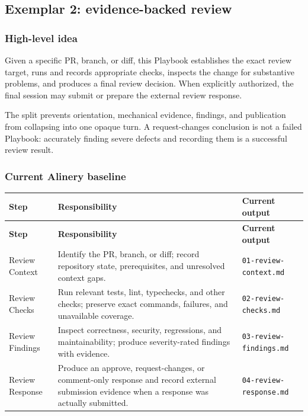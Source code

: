 \documentclass[11pt]{article}
\newcommand{\artifact}[1]{\texttt{#1}}
\begin{document}
\subsection{Exemplar 2: evidence-backed review}

\subsubsection{High-level idea}

Given a specific PR, branch, or diff, this Playbook establishes the exact review target, runs and records appropriate checks, inspects the change for substantive problems, and produces a final review decision. When explicitly authorized, the final session may submit or prepare the external review response.

The split prevents orientation, mechanical evidence, findings, and publication from collapsing into one opaque turn. A request-changes conclusion is not a failed Playbook: accurately finding severe defects and recording them is a successful review result.

\subsubsection{Current Alinery baseline}

\begin{longtable}{@{}L{1.20in}L{2.80in}L{1.90in}@{}}
\toprule
\textbf{Step} & \textbf{Responsibility} & \textbf{Current output} \\
\midrule
\endfirsthead
\toprule
\textbf{Step} & \textbf{Responsibility} & \textbf{Current output} \\
\midrule
\endhead
Review Context & Identify the PR, branch, or diff; record repository state, prerequisites, and unresolved context gaps. & \artifact{01-review-context.md} \\
Review Checks & Run relevant tests, lint, typechecks, and other checks; preserve exact commands, failures, and unavailable coverage. & \artifact{02-review-checks.md} \\
Review Findings & Inspect correctness, security, regressions, and maintainability; produce severity-rated findings with evidence. & \artifact{03-review-findings.md} \\
Review Response & Produce an approve, request-changes, or comment-only response and record external submission evidence when a response was actually submitted. & \artifact{04-review-response.md} \\
\bottomrule
\end{longtable}
\end{document}
